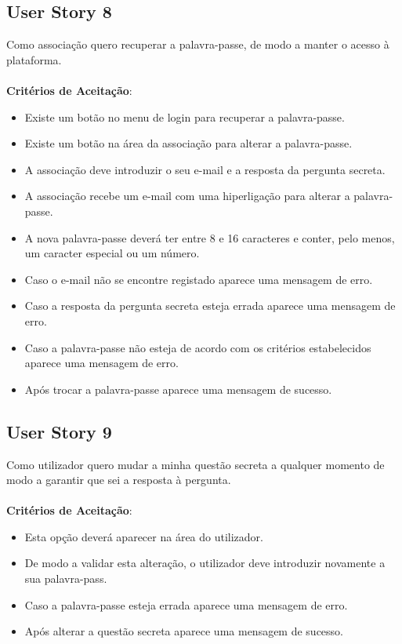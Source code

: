 \documentclass[a4paper,11pt]{article}
\begin{document}
\subsection{User Story 8}
Como associação quero recuperar a palavra-passe, de modo a manter o acesso à plataforma.\\\\
\textbf{Critérios de Aceitação}:
\begin{itemize}
  \item Existe um botão no menu de login para recuperar a palavra-passe.
  \item Existe um botão na área da associação para alterar a palavra-passe.
  \item A associação deve introduzir o seu e-mail e a resposta da pergunta secreta.
  \item A associação recebe um e-mail com uma hiperligação para alterar a palavra-passe.
  \item A nova palavra-passe deverá ter entre 8 e 16 caracteres e conter, pelo menos, um caracter especial ou um número.
  \item Caso o e-mail não se encontre registado aparece uma mensagem de erro.
  \item Caso a resposta da pergunta secreta esteja errada aparece uma mensagem de erro.
  \item Caso a palavra-passe não esteja de acordo com os critérios estabelecidos aparece uma mensagem de erro.
  \item Após trocar a palavra-passe aparece uma mensagem de sucesso.
\end{itemize}

\subsection{User Story 9}
Como utilizador quero mudar a minha questão secreta a qualquer momento de modo a garantir que sei a resposta à pergunta.\\\\
\textbf{Critérios de Aceitação}:
\begin{itemize}
  \item Esta opção deverá aparecer na área do utilizador.
  \item De modo a validar esta alteração, o utilizador deve introduzir novamente a sua palavra-pass.
  \item Caso a palavra-passe esteja errada aparece uma mensagem de erro.
  \item Após alterar a questão secreta aparece uma mensagem de sucesso.
\end{itemize}
\end{document}
